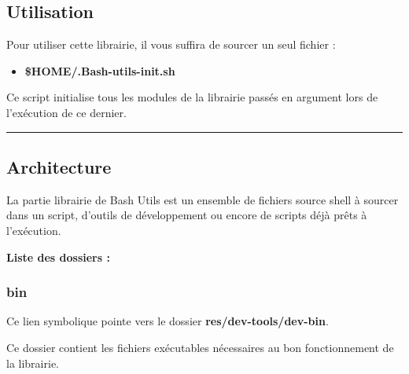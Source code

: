\documentclass[a4paper,10pt]{article}
\begin{document}
\subsection{Utilisation}\color{white}

\begin{justify}
    Pour utiliser cette librairie, il vous suffira de sourcer un seul fichier :

    \begin{itemize}
        \item \color{orange}\textbf{\$HOME\color{lime}/.Bash-utils-init.sh}\color{white}
    \end{itemize}
\end{justify}

\begin{justify}
    Ce script initialise tous les modules de la librairie passés en argument lors de l'exécution de ce dernier.
\end{justify}




\color{green}\par\noindent\rule{\textwidth}{0.4pt}\color{white}

\color{green}
\subsection{Architecture}\color{white}

\begin{justify}
    La partie librairie de Bash Utils est un ensemble de fichiers source shell à sourcer dans un script, d'outils de développement ou encore de scripts déjà prêts à l'exécution.
\end{justify}


\textbf{Liste des dossiers :}

\color{blue}
\subsubsection{bin}\color{white}

\begin{justify}
    Ce lien symbolique pointe vers le dossier \textbf{\color{lime}res/dev-tools/dev-bin}.
\end{justify}

\begin{justify}
    Ce dossier contient les fichiers exécutables nécessaires au bon fonctionnement de la librairie.
\end{justify}
\end{document}

